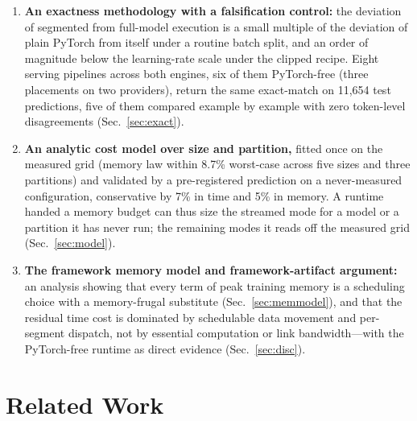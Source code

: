 \documentclass[journal]{IEEEtran}
\begin{document}
\begin{enumerate}
  co-tenant noise, and serving shows no session leak
  (Secs.~\ref{sec:longhorizon}, \ref{sec:infereval} and~\ref{sec:scale},
  Tables~\ref{tab:sustainedtrain} and~\ref{tab:sustainedserve}).
\item \textbf{An exactness methodology with a falsification control:} the
  deviation of segmented from full-model execution is a small multiple of
  the deviation of plain PyTorch from itself under a routine batch split,
  and an order of magnitude below the learning-rate scale under the clipped
  recipe. Eight serving pipelines across both engines, six of them
  PyTorch-free (three placements on two providers), return the same exact-match
  on 11{,}654 test predictions, five of them compared example by example with
  zero token-level disagreements (Sec.~\ref{sec:exact}).
\item \textbf{An analytic cost model over size and partition,} fitted once
  on the measured grid (memory law within 8.7\% worst-case across five sizes
  and three partitions) and validated by a pre-registered prediction on a
  never-measured configuration, conservative by 7\% in time and 5\% in
  memory. A runtime handed a memory budget can thus size the streamed mode
  for a model or a partition it has never run; the remaining modes it reads
  off the measured grid (Sec.~\ref{sec:model}).
\item \textbf{The framework memory model and framework-artifact argument:}
  an analysis showing that every term of peak training memory is a
  scheduling choice with a memory-frugal substitute
  (Sec.~\ref{sec:memmodel}), and that the residual time cost is dominated
  by schedulable data movement and per-segment dispatch, not by essential
  computation or link bandwidth---with the PyTorch-free runtime as direct
  evidence (Sec.~\ref{sec:disc}).
\end{enumerate}

\section{Related Work}\label{sec:background}
\end{document}
